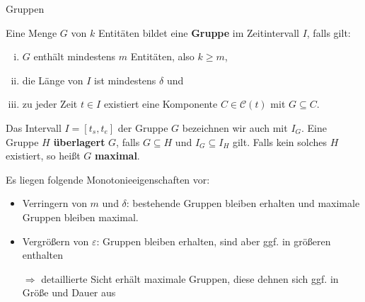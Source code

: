 \documentclass[
wide,
10pt,
xcolor={x11names,svgnames},
hyperref={pdfauthor={Jannes Bantje},colorlinks,urlcolor=maincolor,hidelinks=false,linkcolor=maincolor},
pantone312, 	%
]{beamer}
\newcommand{\Index}[1]{\bet{#1}}
\newcommand{\bet}[1]{\textbf{\color{maincolor}#1}}
\theoremstyle{definition}
\begin{document}
\begin{frame}{Gruppen}
    \begin{definition}[Gruppe]
    	Eine Menge $G$ von $k$ Entitäten bildet eine \Index{Gruppe} im Zeitintervall $I$, falls gilt:
    	\begin{enumerate}[(i)]
    		\item $G$ enthält mindestens $m$ Entitäten, also $k \ge m$,
    		\item die Länge von $I$ ist mindestens $\delta$ und
    		\item zu jeder Zeit $t \in I$ existiert eine Komponente $C \in \mathcal{C}(t)$ mit $G \subseteq C$.
    	\end{enumerate}
    	Das Intervall $I=[t_s,t_e]$ der Gruppe $G$ bezeichnen wir auch mit $I_G$.
    	Eine Gruppe $H$ \bet{überlagert} $G$, falls $G \subseteq H$ und $I_G \subseteq I_H$ gilt.
    	Falls kein solches $H$ existiert, so heißt $G$ \bet{maximal}.
    \end{definition}\pause
    Es liegen folgende Monotonieeigenschaften vor:\pause
    \begin{itemize}[<+->]
        \item Verringern von $m$ und $\delta$: bestehende Gruppen bleiben erhalten und maximale Gruppen bleiben maximal.
        \item Vergrößern von $\varepsilon$:
        Gruppen bleiben erhalten, sind aber ggf. in größeren enthalten
        \item[$\Rightarrow$] detaillierte Sicht erhält maximale Gruppen, diese dehnen sich ggf. in Größe und Dauer aus
    \end{itemize}
\end{frame}
\end{document}
